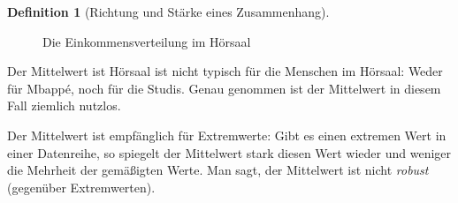 \documentclass[
  a4paper,
  DIV=11]{scrreprt}
\theoremstyle{definition}
\theoremstyle{definition}
\theoremstyle{definition}
\newtheorem{definition}{Definition}[chapter]
\theoremstyle{remark}
\begin{document}
\begin{definition}[Richtung und Stärke eines
Zusammenhang]
\begin{figure}
\begin{minipage}{\linewidth}
{}


\end{minipage}%
\newline
\begin{minipage}{\linewidth}



\end{minipage}%

\caption{\label{fig-mbappe}Die Einkommensverteilung im Hörsaal}

\end{figure}%

Der Mittelwert ist Hörsaal ist nicht typisch für die Menschen im
Hörsaal: Weder für Mbappé, noch für die Studis. Genau genommen ist der
Mittelwert in diesem Fall ziemlich nutzlos.

\begin{tcolorbox}[enhanced jigsaw, leftrule=.75mm, opacitybacktitle=0.6, colback=white, colframe=quarto-callout-important-color-frame, coltitle=black, colbacktitle=quarto-callout-important-color!10!white, opacityback=0, left=2mm, breakable, titlerule=0mm, toptitle=1mm, bottomtitle=1mm, rightrule=.15mm, title=\textcolor{quarto-callout-important-color}{\faExclamation}\hspace{0.5em}{Wichtig}, arc=.35mm, bottomrule=.15mm, toprule=.15mm]

Der Mittelwert ist empfänglich für Extremwerte: Gibt es einen extremen
Wert in einer Datenreihe, so spiegelt der Mittelwert stark diesen Wert
wieder und weniger die Mehrheit der gemäßigten Werte. Man sagt, der
Mittelwert ist nicht \emph{robust} (gegenüber Extremwerten).


\end{tcolorbox}
\end{definition}
\end{document}
